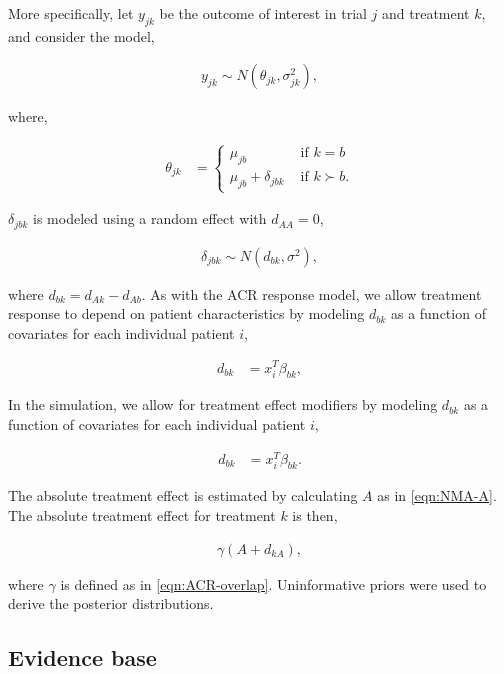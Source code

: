 \documentclass[11pt,final,fleqn]{article}\usepackage[]{graphicx}\usepackage[]{color}
\theoremstyle{plain}
\begin{document}
\begin{appendices}
More specifically, let $y_{jk}$ be the outcome of interest in trial $j$ and treatment $k$, and consider the model,

\begin{align}
y_{jk} \sim N(\theta_{jk}, \sigma^2_{jk}),
\end{align}

where,

\begin{align}
\theta_{jk} &=
 \begin{cases}
     \mu_{jb} & \text{ if } k = b \\
     \mu_{jb} + \delta_{jbk} & \text{ if } k \succ b.
  \end{cases}
\end{align}

$\delta_{jbk}$ is modeled using a random effect with $d_{AA} =0$,

\begin{align}
\delta_{jbk} \sim N(d_{bk}, \sigma^2),
\end{align}

where $d_{bk} = d_{Ak} - d_{Ab}$. As with the ACR response model, we allow treatment response to depend on patient characteristics by modeling $d_{bk}$ as a function of covariates for each individual patient $i$,

\begin{align}
d_{bk} &= x_{i}^T\beta_{bk},
\end{align}

In the simulation, we allow for treatment effect modifiers by modeling $d_{bk}$ as a function of covariates for each individual patient $i$,

\begin{align}
d_{bk} &= x_{i}^T\beta_{bk}.
\end{align}

The absolute treatment effect is estimated by calculating $A$ as in \autoref{eqn:NMA-A}. The absolute treatment effect for treatment $k$ is then,

\begin{align}
\gamma (A + d_{kA}),
\end{align}

where $\gamma$ is defined as in \autoref{eqn:ACR-overlap}. Uninformative priors were used to derive the posterior distributions.

\subsection{Evidence base}

\end{appendices}
\end{document}
